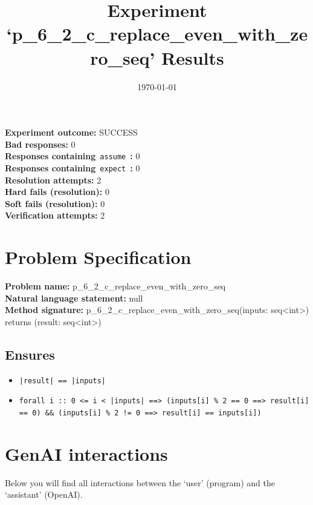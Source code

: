 \documentclass{article}
\begin{document}
\title{Experiment `p\_6\_2\_c\_replace\_even\_with\_zero\_seq' Results}
\author{\today}
\date{}
\maketitle
\textbf{Experiment outcome: }SUCCESS
\\\textbf{Bad responses: }0
\\\textbf{Responses containing}~\texttt{assume}~\textbf{: }0
\\\textbf{Responses containing}~\texttt{expect}~\textbf{: }0
\\\textbf{Resolution attempts: }2
\\\textbf{Hard fails (resolution): }0
\\\textbf{Soft fails (resolution): }0
\\\textbf{Verification attempts: }2
\section*{Problem Specification}
\textbf{Problem name: }p\_6\_2\_c\_replace\_even\_with\_zero\_seq
\\\textbf{Natural language statement: }null
\\\textbf{Method signature: }p\_6\_2\_c\_replace\_even\_with\_zero\_seq(inputs: seq<int>) returns (result: seq<int>)
\subsection*{Ensures}
\begin{itemize}
\item \texttt{|result| == |inputs|}
\item \texttt{forall i :: 0 <= i < |inputs| ==> (inputs[i] \% 2 == 0 ==> result[i] == 0) \&\& (inputs[i] \% 2 != 0 ==> result[i] == inputs[i])}
\end{itemize}
\clearpage
\section*{GenAI interactions}
Below you will find all interactions between the `user' (program) and the `assistant' (OpenAI).
\end{document}
